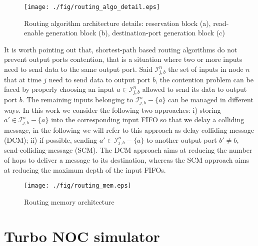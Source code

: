 \documentclass[10pt,twocolumn,journal]{IEEEtran}
\begin{document}
\begin{figure*}[th!]
  \centering
  \texttt{[image: ./fig/routing\_algo\_detail.eps]}
\caption{Routing algorithm architecture details: reservation block (a), read-enable generation block (b), 
destination-port generation block (c)}
\label{fig:routing_algo_detail}
\end{figure*}

It is worth pointing out that, shortest-path based routing algorithms do not prevent output ports contention,  
that is a situation where 
two or more inputs need to send data to the same output port. 
Said $\mathcal{I}^n_{j,b}$ the set of inputs in node $n$ that at time $j$ need to send data to output port $b$, 
the contention problem can be faced by properly choosing an input $a \in \mathcal{I}^n_{j,b}$ allowed to send its data to output port $b$.
The remaining inputs belonging to $\mathcal{I}^n_{j,b}-\{a\}$ can be managed in different ways.
In this work we consider the following two approaches: 
i) storing $a' \in \mathcal{I}^n_{j,b}-\{a\}$ into the corresponding input FIFO so that we delay a colliding message, 
in the following we will refer to this approach as delay-colliding-message (DCM);
ii) if possible, sending $a' \in \mathcal{I}^n_{j,b}-\{a\}$ to 
another output port $b' \ne b$, send-colliding-message (SCM).
The DCM approach aims at reducing the number of hops 
to deliver a message to its destination, whereas the SCM approach aims at reducing the maximum depth of the input FIFOs.
\begin{figure}[th!]
  \centering
  \texttt{[image: ./fig/routing\_mem.eps]}
\caption{Routing memory architecture}
\label{fig:routing_mem}
\end{figure}

\section{Turbo NOC simulator}
\label{sec:tnoc}
\end{document}
